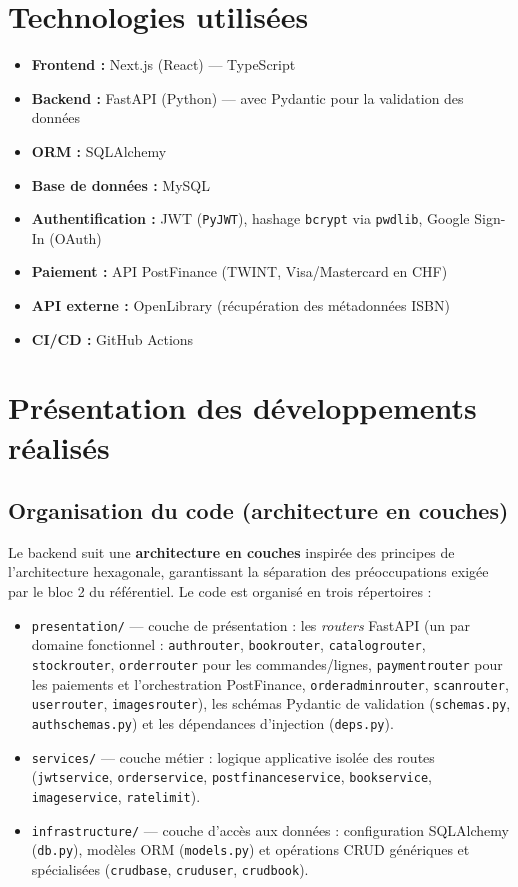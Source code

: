 \documentclass[12pt, a4paper]{report}
\renewcommand{\_}{\origunderscore\allowbreak}
\begin{document}
\section{Technologies utilisées}

\begin{itemize}
    \item \textbf{Frontend :} Next.js (React) — TypeScript
    \item \textbf{Backend :} FastAPI (Python) — avec Pydantic pour la validation des données
    \item \textbf{ORM :} SQLAlchemy
    \item \textbf{Base de données :} MySQL
    \item \textbf{Authentification :} JWT (\texttt{PyJWT}), hashage \texttt{bcrypt} via \texttt{pwdlib}, Google Sign-In (OAuth)
    \item \textbf{Paiement :} API PostFinance (TWINT, Visa/Mastercard en CHF)
    \item \textbf{API externe :} OpenLibrary (récupération des métadonnées ISBN)
    \item \textbf{CI/CD :} GitHub Actions
\end{itemize}

\section{Présentation des développements réalisés}

\subsection{Organisation du code (architecture en couches)}

Le backend suit une \textbf{architecture en couches} inspirée des principes de l'architecture hexagonale, garantissant la séparation des préoccupations exigée par le bloc 2 du référentiel. Le code est organisé en trois répertoires :

\begin{itemize}
    \item \texttt{presentation/} — couche de présentation : les \textit{routers} FastAPI (un par domaine fonctionnel : \texttt{auth\_router}, \texttt{book\_router}, \texttt{catalog\_router}, \texttt{stock\_router}, \texttt{order\_router} pour les commandes/lignes, \texttt{payment\_router} pour les paiements et l'orchestration PostFinance, \texttt{order\_admin\_router}, \texttt{scan\_router}, \texttt{user\_router}, \texttt{images\_router}), les schémas Pydantic de validation (\texttt{schemas.py}, \texttt{auth\_schemas.py}) et les dépendances d'injection (\texttt{deps.py}).
    \item \texttt{services/} — couche métier : logique applicative isolée des routes (\texttt{jwt\_service}, \texttt{order\_service}, \texttt{postfinance\_service}, \texttt{book\_service}, \texttt{image\_service}, \texttt{rate\_limit}).
    \item \texttt{infrastructure/} — couche d'accès aux données : configuration SQLAlchemy (\texttt{db.py}), modèles ORM (\texttt{models.py}) et opérations CRUD génériques et spécialisées (\texttt{crud\_base}, \texttt{crud\_user}, \texttt{crud\_book}).
\end{itemize}
\end{document}
